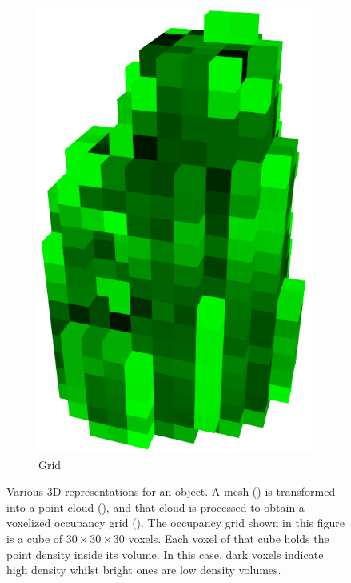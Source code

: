 \begin{figure}[!t]
\begin{subfigure}{0.3\linewidth}
    \includegraphics[width=0.9\linewidth]{Figures/ObjRecog/detergent_grid.png}
    \caption{Grid}
    \label{fig:objrecog:meshcloudgrid:grid}
  \end{subfigure}
  \caption{Various 3D representations for an object. A mesh () is transformed into a point cloud (), and that cloud is processed to obtain a voxelized occupancy grid (). The occupancy grid shown in this figure is a cube of $30\times 30 \times 30$ voxels. Each voxel of that cube holds the point density inside its volume. In this case, dark voxels indicate high density whilst bright ones are low density volumes.}
  \label{fig:objrecog:meshcloudgrid}
\end{figure}


